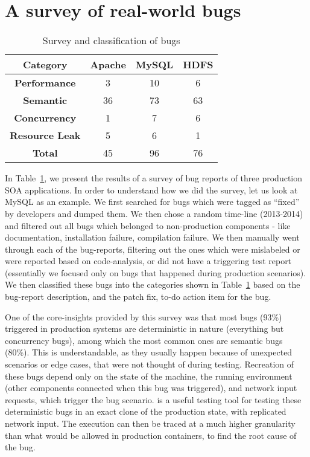 \section{A survey of real-world bugs}
\label{sec:parikshanSurvey}

\begin{table}[!h]
\centering
\begin{tabular}{cccc}
\toprule
\textbf{Category} & \textbf{Apache} & \textbf{MySQL} & \textbf{HDFS} \\ \midrule
\textbf{Performance} & 3 & 10 & 6 \\ 
\textbf{Semantic} & 36 & 73 & 63 \\ 
\textbf{Concurrency} & 1 & 7 & 6 \\ 
\textbf{Resource Leak} & 5 & 6 & 1 \\ \midrule
\textbf{Total} & 45 & 96 & 76 \\
\bottomrule
\end{tabular}
\caption{Survey and classification of bugs}
\label{tab:survey}
\end{table}

In Table~\ref{tab:survey}, we present the results of a survey of bug reports of three production SOA applications.
In order to understand how we did the survey, let us look at MySQL as an example.
We first searched for bugs which were tagged as ``fixed'' by developers and dumped them.
We then chose a random time-line (2013-2014) and filtered out all bugs which belonged to non-production components - like documentation, installation failure, compilation failure.
We then manually went through each of the bug-reports, filtering out the ones which were mislabeled or were reported based on code-analysis, or did not have a triggering test report (essentially we focused only on bugs that happened during production scenarios).
We then classified these bugs into the categories shown in Table~\ref{tab:survey} based on the bug-report description, and the patch fix, to-do action item for the bug.

One of the core-insights provided by this survey was that most bugs (93\%) triggered in production systems are deterministic in nature (everything but concurrency bugs), among which the most common ones are semantic bugs (80\%).
This is understandable, as they usually happen because of unexpected scenarios or edge cases, that were not thought of during testing.
Recreation of these bugs depend only on the state of the machine, the running environment (other components connected when this bug was triggered), and network input requests, which trigger the bug scenario.
\parikshan is a useful testing tool for testing these deterministic bugs in an exact clone of the production state, with replicated network input. 
The execution can then be traced at a much higher granularity than what would be allowed in production containers, to find the root cause of the bug. 

